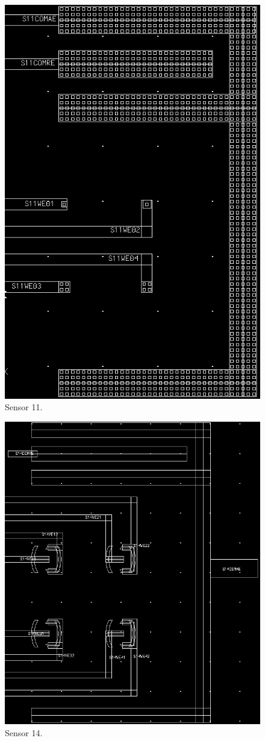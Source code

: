 \begin{figure}
	\centering
	\includegraphics[width=0.7\linewidth]{figures/s11.png}
	\caption{Sensor 11.}
	\label{s11}
\end{figure}

\begin{figure}
	\centering
	\includegraphics[width=0.7\linewidth]{figures/s14.png}
	\caption{Sensor 14.}
	\label{s14}
\end{figure}

